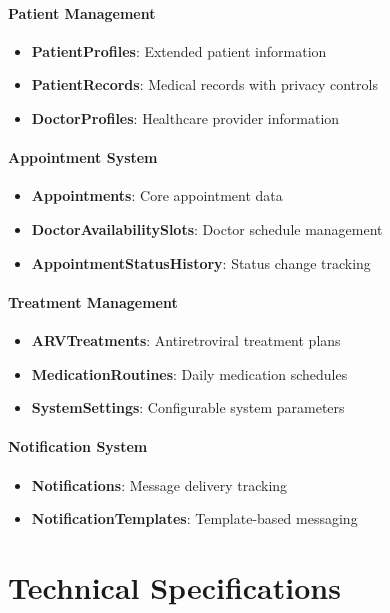 \documentclass[12pt,a4paper]{article}
\begin{document}
\paragraph{Patient Management}
\begin{itemize}
    \item \textbf{PatientProfiles}: Extended patient information
    \item \textbf{PatientRecords}: Medical records with privacy controls
    \item \textbf{DoctorProfiles}: Healthcare provider information
\end{itemize}

\paragraph{Appointment System}
\begin{itemize}
    \item \textbf{Appointments}: Core appointment data
    \item \textbf{DoctorAvailabilitySlots}: Doctor schedule management
    \item \textbf{AppointmentStatusHistory}: Status change tracking
\end{itemize}

\paragraph{Treatment Management}
\begin{itemize}
    \item \textbf{ARVTreatments}: Antiretroviral treatment plans
    \item \textbf{MedicationRoutines}: Daily medication schedules
    \item \textbf{SystemSettings}: Configurable system parameters
\end{itemize}

\paragraph{Notification System}
\begin{itemize}
    \item \textbf{Notifications}: Message delivery tracking
    \item \textbf{NotificationTemplates}: Template-based messaging
\end{itemize}

\section{Technical Specifications}
\end{document}
